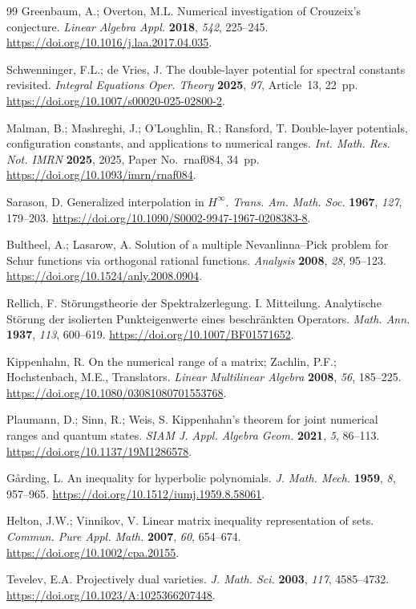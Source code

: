 \documentclass[preprints,article,submit,oneauthor]{Definitions/mdpi}
\numberwithin{equation}{section}
\begin{document}
\begin{thebibliography}{99}
Greenbaum, A.; Overton, M.L. Numerical investigation of Crouzeix's
conjecture. \emph{Linear Algebra Appl.} \textbf{2018}, \emph{542}, 225--245.
\url{https://doi.org/10.1016/j.laa.2017.04.035}.

Schwenninger, F.L.; de Vries, J. The double-layer potential for spectral
constants revisited. \emph{Integral Equations Oper. Theory} \textbf{2025},
\emph{97}, Article~13, 22~pp.
\url{https://doi.org/10.1007/s00020-025-02800-2}.

Malman, B.; Mashreghi, J.; O'Loughlin, R.; Ransford, T. Double-layer
potentials, configuration constants, and applications to numerical ranges.
\emph{Int. Math. Res. Not. IMRN} \textbf{2025}, 2025, Paper No.~rnaf084,
34~pp. \url{https://doi.org/10.1093/imrn/rnaf084}.

Sarason, D. Generalized interpolation in \(H^{\infty}\).
\emph{Trans. Am. Math. Soc.} \textbf{1967}, \emph{127}, 179--203.
\url{https://doi.org/10.1090/S0002-9947-1967-0208383-8}.

Bultheel, A.; Lasarow, A. Solution of a multiple Nevanlinna--Pick problem
for Schur functions via orthogonal rational functions.
\emph{Analysis} \textbf{2008}, \emph{28}, 95--123.
\url{https://doi.org/10.1524/anly.2008.0904}.

Rellich, F. St\"orungstheorie der Spektralzerlegung. I. Mitteilung.
Analytische St\"orung der isolierten Punkteigenwerte eines beschr\"ankten
Operators. \emph{Math. Ann.} \textbf{1937}, \emph{113}, 600--619.
\url{https://doi.org/10.1007/BF01571652}.

Kippenhahn, R. On the numerical range of a matrix; Zachlin, P.F.;
Hochstenbach, M.E., Translators. \emph{Linear Multilinear Algebra}
\textbf{2008}, \emph{56}, 185--225.
\url{https://doi.org/10.1080/03081080701553768}.

Plaumann, D.; Sinn, R.; Weis, S. Kippenhahn's theorem for joint numerical
ranges and quantum states. \emph{SIAM J. Appl. Algebra Geom.}
\textbf{2021}, \emph{5}, 86--113.
\url{https://doi.org/10.1137/19M1286578}.

G{\aa}rding, L. An inequality for hyperbolic polynomials.
\emph{J. Math. Mech.} \textbf{1959}, \emph{8}, 957--965.
\url{https://doi.org/10.1512/iumj.1959.8.58061}.

Helton, J.W.; Vinnikov, V. Linear matrix inequality representation of sets.
\emph{Commun. Pure Appl. Math.} \textbf{2007}, \emph{60}, 654--674.
\url{https://doi.org/10.1002/cpa.20155}.

Tevelev, E.A. Projectively dual varieties.
\emph{J. Math. Sci.} \textbf{2003}, \emph{117}, 4585--4732.
\url{https://doi.org/10.1023/A:1025366207448}.

\end{thebibliography}
\end{document}

